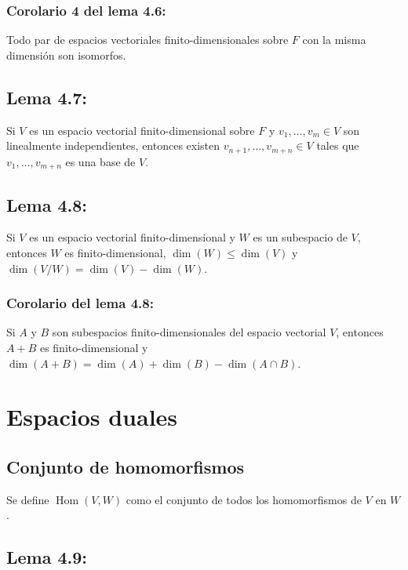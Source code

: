 \documentclass{article}
\DeclareMathOperator{\Hom}{Hom}
\begin{document}
\subsubsection*{\color{blue} Corolario 4 del lema 4.6:}

Todo par de espacios vectoriales finito-dimensionales sobre $F$ con la misma dimensión son isomorfos.

\subsection*{\color{blue} Lema 4.7:}

Si $V$ es un espacio vectorial finito-dimensional sobre $F$ y $v_1,\ldots,v_m\in V$ son linealmente independientes, entonces existen $v_{n+1},\ldots,v_{m+n}\in V$ tales que $v_1,\ldots,v_{m+n}$ es una base de $V$.

\subsection*{\color{blue} Lema 4.8:}

Si $V$ es un espacio vectorial finito-dimensional y $W$ es un subespacio de $V$, entonces $W$ es finito-dimensional, $\dim(W)\leq\dim(V)$ y $\dim(V/W)=\dim(V)-\dim(W)$.

\subsubsection*{\color{blue} Corolario del lema 4.8:}

Si $A$ y $B$ son subespacios finito-dimensionales del espacio vectorial $V$, entonces $A+B$ es finito-dimensional y $\dim(A+B)=\dim(A)+\dim(B)-\dim(A\cap B)$.

\newpage

\section{Espacios duales}

\subsection*{\color{violet} Conjunto de homomorfismos}

Se define $\Hom(V,W)$ como el conjunto de todos los homomorfismos de $V$ en $W$. 

\subsection*{\color{blue} Lema 4.9:}
\end{document}
